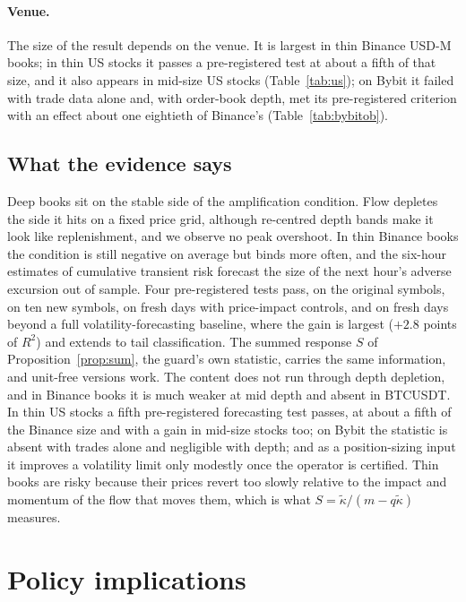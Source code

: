 \documentclass[12pt]{article}
\theoremstyle{definition}
\theoremstyle{remark}
\begin{document}
\paragraph{Venue.} The size of the result depends on the venue. It is largest in thin Binance USD-M books; in thin US stocks it passes a pre-registered test at about a fifth of that size, and it also appears in mid-size US stocks (Table~\ref{tab:us}); on Bybit it failed with trade data alone and, with order-book depth, met its pre-registered criterion with an effect about one eightieth of Binance's (Table~\ref{tab:bybitob}).

\subsection{What the evidence says}\label{sec:thin_summary}
Deep books sit on the stable side of the amplification condition. Flow depletes the side it hits on a fixed price grid, although re-centred depth bands make it look like replenishment, and we observe no peak overshoot. In thin Binance books the condition is still negative on average but binds more often, and the six-hour estimates of cumulative transient risk forecast the size of the next hour's adverse excursion out of sample. Four pre-registered tests pass, on the original symbols, on ten new symbols, on fresh days with price-impact controls, and on fresh days beyond a full volatility-forecasting baseline, where the gain is largest ($+2.8$ points of $R^2$) and extends to tail classification. The summed response $S$ of Proposition~\ref{prop:sum}, the guard's own statistic, carries the same information, and unit-free versions work. The content does not run through depth depletion, and in Binance books it is much weaker at mid depth and absent in BTCUSDT. In thin US stocks a fifth pre-registered forecasting test passes, at about a fifth of the Binance size and with a gain in mid-size stocks too; on Bybit the statistic is absent with trades alone and negligible with depth; and as a position-sizing input it improves a volatility limit only modestly once the operator is certified. Thin books are risky because their prices revert too slowly relative to the impact and momentum of the flow that moves them, which is what $S=\tilde\kappa/(m-q\tilde\kappa)$ measures.
\section{Policy implications}\label{sec:policy}
\end{document}
